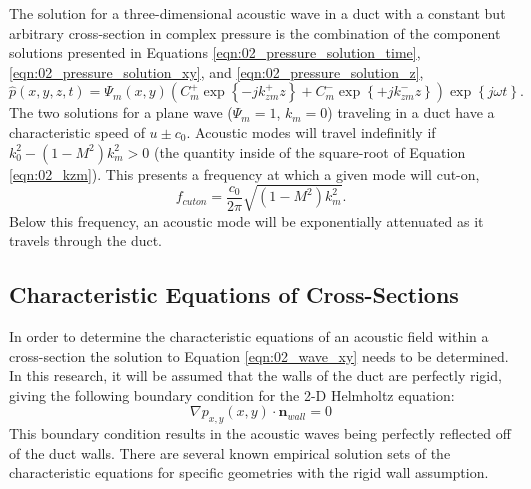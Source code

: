 The solution for a three-dimensional acoustic wave in a duct with a constant but arbitrary cross-section in complex pressure is the combination of the component solutions presented in Equations \ref{eqn:02_pressure_solution_time}, \ref{eqn:02_pressure_solution_xy}, and \ref{eqn:02_pressure_solution_z},
\begin{equation}
  \hat{p}(x,y,z,t) = \Psi_m(x,y)\left(C^+_m\exp{\left\{-jk^+_{zm}z\right\}}+C^-_m\exp{\left\{+jk^-_{zm}z\right\}}\right)\exp\left\{j\omega t\right\} \textrm{.}
  \label{eqn:02_pressure_solution_duct}
\end{equation}
The two solutions for a plane wave ($\Psi_m=1$, $k_m=0$) traveling in a duct have a characteristic speed of $u\pm c_0$.
Acoustic modes will travel indefinitly if $k_0^2-(1-M^2)k_m^2>0$ (the quantity inside of the square-root of Equation \ref{eqn:02_kzm}).
This presents a frequency at which a given mode will cut-on,
\begin{equation}
  f_{cuton} = \frac{c_0}{2\pi}\sqrt{(1-M^2)k_m^2} \textrm{.}
  \label{eqn:02_cuton_freq}
\end{equation}
Below this frequency, an acoustic mode will be exponentially attenuated as it travels through the duct.

\subsection{Characteristic Equations of Cross-Sections}
In order to determine the characteristic equations of an acoustic field within a cross-section the solution to Equation \ref{eqn:02_wave_xy} needs to be determined.
In this research, it will be assumed that the walls of the duct are perfectly rigid, giving the following boundary condition for the 2-D Helmholtz equation:
\begin{equation}
  \nabla p_{x,y}(x,y)\cdot\mathbf{n}_{wall} = 0
  \label{eqn:02_bc_rigig_wall}
\end{equation}
This boundary condition results in the acoustic waves being perfectly reflected off of the duct walls.
There are several known empirical solution sets of the characteristic equations for specific geometries with the rigid wall assumption.

